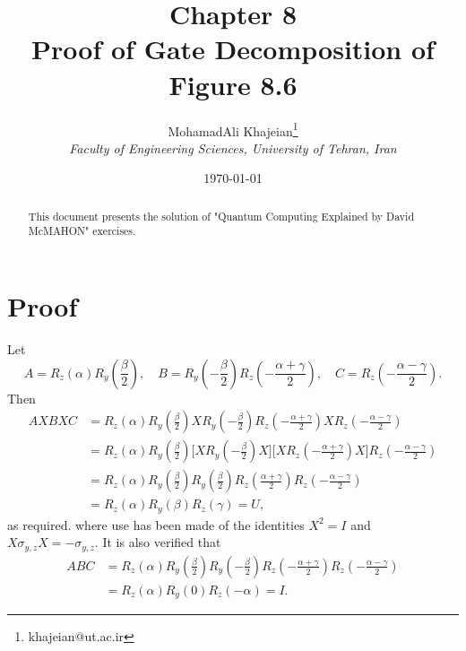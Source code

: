 \documentclass{article}
\title{\textbf{Chapter 8} \\ \small Proof of Gate Decomposition of Figure 8.6}
\author{
    MohamadAli Khajeian\footnote{khajeian@ut.ac.ir} \\ 
    \small \textit{Faculty of Engineering Sciences, University of Tehran, Iran} \\ 
}
\date{\today}
\begin{document}
\maketitle

\begin{abstract}
    This document presents the solution of "Quantum Computing Explained by David McMAHON" exercises.
\end{abstract}

\section*{Proof}
Let
\[
A = R_z(\alpha) R_y\left(\frac{\beta}{2}\right), \quad
B = R_y\left(-\frac{\beta}{2}\right) R_z\left(-\frac{\alpha + \gamma}{2}\right), \quad
C = R_z\left(-\frac{\alpha - \gamma}{2}\right).
\]
Then
\begin{align*}
AXBXC &= R_z(\alpha) R_y\left(\frac{\beta}{2}\right)
X R_y\left(-\frac{\beta}{2}\right) R_z\left(-\frac{\alpha + \gamma}{2}\right)
X R_z\left(-\frac{\alpha - \gamma}{2}\right) \\
&= R_z(\alpha) R_y\left(\frac{\beta}{2}\right) 
\bigg[X R_y\left(-\frac{\beta}{2}\right)
X\bigg] \bigg[ X R_z\left(-\frac{\alpha + \gamma}{2}\right)
X \bigg] R_z\left(-\frac{\alpha - \gamma}{2}\right) \\
&= R_z(\alpha) R_y\left(\frac{\beta}{2}\right) R_y\left(\frac{\beta}{2}\right)
R_z\left(\frac{\alpha + \gamma}{2}\right) R_z\left(-\frac{\alpha - \gamma}{2}\right) \\
&= R_z(\alpha) R_y(\beta) R_z(\gamma) = U,
\end{align*}
as required. where use has been made of the identities \( X^2 = I \) and \( X \sigma_{y,z} X = -\sigma_{y,z} \).
It is also verified that
\begin{align*}    
ABC &= R_z(\alpha) R_y\left(\frac{\beta}{2}\right)
R_y\left(-\frac{\beta}{2}\right)
R_z\left(-\frac{\alpha + \gamma}{2}\right)
R_z\left(-\frac{\alpha - \gamma}{2}\right) \\
&= R_z(\alpha) R_y(0) R_z(-\alpha) = I.
\end{align*}
\end{document}
